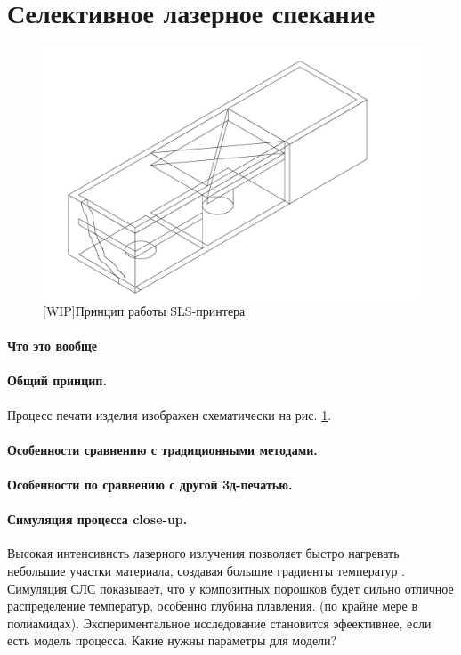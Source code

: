 \section{Селективное лазерное спекание}

\begin{figure}[h]
    \centering
    \includegraphics[width=\linewidth]{fig/sls-30deg.pdf}
    \caption{[WIP]Принцип работы SLS-принтера}
    \label{fig:printer}
\end{figure}

\paragraph{Что это вообще}
\paragraph{Общий принцип. }Процесс печати изделия изображен схематически на рис. \ref{fig:printer}.
\paragraph{Особенности сравнению с традиционными методами.}
\paragraph{Особенности по сравнению с другой 3д-печатью.}
\paragraph{Симуляция процесса close-up.}


Высокая интенсивнсть лазерного излучения позволяет быстро нагревать небольшие участки материала, создавая большие градиенты температур \cite{sls-sim2016}.
\\
Симуляция СЛС показывает, что у композитных порошков будет сильно отличное распределение температур, особенно глубина плавления. (по крайне мере в полиамидах)\cite{sls-sim2016}. Экспериментальное исследование становится эфеективнее, если есть модель процесса.
Какие нужны параметры для модели?

